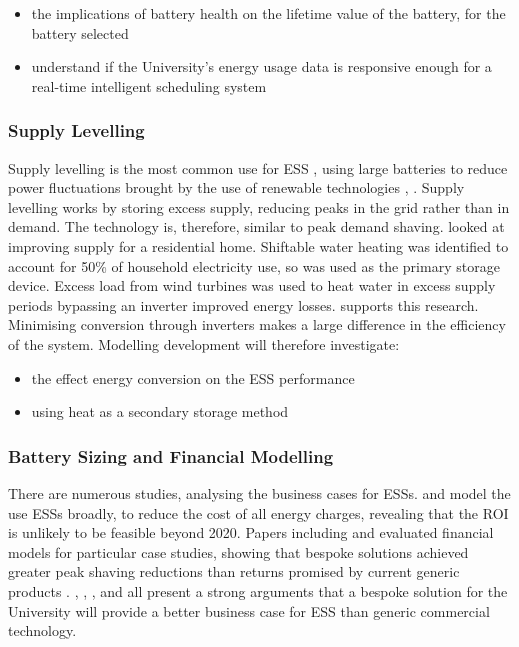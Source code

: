 \begin{itemize}
\tightlist
\item
  the implications of battery health on the lifetime value of the
  battery, for the battery selected
\item
  understand if the University's energy usage data is responsive enough
  for a real-time intelligent scheduling system
\end{itemize}

\subsubsection{Supply Levelling}\label{supply-levelling}

Supply levelling is the most common use for ESS \cite{iearoadmapes},
using large batteries to reduce power fluctuations brought by the use of
renewable technologies \cite{7324861}, \cite{7564619}. Supply levelling
works by storing excess supply, reducing peaks in the grid rather than
in demand. The technology is, therefore, similar to peak demand shaving.
\cite{Allik20161116} looked at improving supply for a residential home.
Shiftable water heating was identified to account for 50\% of household
electricity use, so was used as the primary storage device. Excess load
from wind turbines was used to heat water in excess supply periods
bypassing an inverter improved energy losses. \cite{Leadbetter2012685}
supports this research. Minimising conversion through inverters makes a
large difference in the efficiency of the system. Modelling development
will therefore investigate:

\begin{itemize}
\tightlist
\item
  the effect energy conversion on the ESS performance
\item
  using heat as a secondary storage method
\end{itemize}

\subsubsection{Battery Sizing and Financial
Modelling}\label{battery-sizing-and-financial-modelling}

There are numerous studies, analysing the business cases for ESSs.
\cite{7555795} and \cite{7555793} model the use ESSs broadly, to reduce
the cost of all energy charges, revealing that the ROI is unlikely to be
feasible beyond 2020. Papers including \cite{1300158} and \cite{6175723}
evaluated financial models for particular case studies, showing that
bespoke solutions achieved greater peak shaving reductions than returns
promised by current generic products \cite{abbpeakshave}.
\cite{7555795}, \cite{7555793}, \cite{1300158}, \cite{6175723} and
\cite{20164002874437} all present a strong arguments that a bespoke
solution for the University will provide a better business case for ESS
than generic commercial technology.

